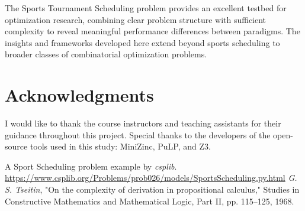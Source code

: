 \documentclass[11pt]{article}
\begin{document}
The Sports Tournament Scheduling problem provides an excellent testbed for optimization research, combining clear problem structure with sufficient complexity to reveal meaningful performance differences between paradigms. The insights and frameworks developed here extend beyond sports scheduling to broader classes of combinatorial optimization problems.

\section*{Acknowledgments}

I would like to thank the course instructors and teaching assistants for their guidance throughout this project. Special thanks to the developers of the open-source tools used in this study: MiniZinc, PuLP, and Z3.


\begin{thebibliography}{99}

A Sport Scheduling problem example by \textit{csplib}.\\
\url{https://www.csplib.org/Problems/prob026/models/SportsScheduling.py.html}
\textit{G. S. Tseitin}, "On the complexity of derivation in propositional calculus," Studies in Constructive Mathematics and Mathematical Logic, Part II, pp. 115–125, 1968.

\end{thebibliography}
\end{document}
